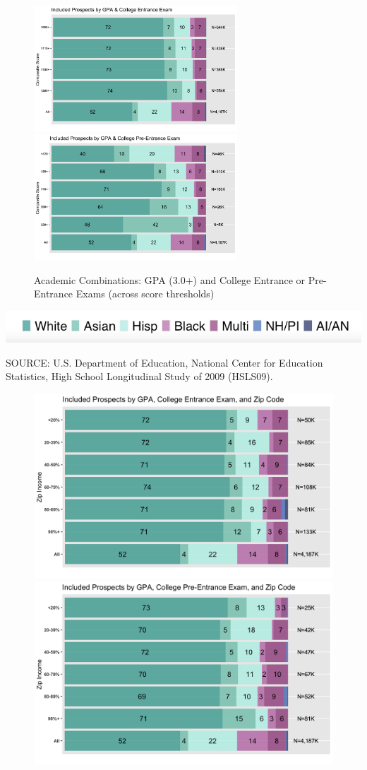 \documentclass[
  12pt,
]{article}
\begin{document}
\pagebreak

\begin{landscape}



\begin{figure}

{\centering \includegraphics[width=3in]{./../../outputs/figures/combo1_inc_satv2} \includegraphics[width=3in]{./../../outputs/figures/combo1_inc_psatv2} 

}

\caption{Academic Combinations: GPA (3.0+) and College Entrance or Pre-Entrance Exams (across score thresholds)}\label{fig:gpa-sat-psat}
\end{figure}


\begin{center}\includegraphics[width=0.32\linewidth]{./../../outputs/figures/legend_horizontal} \end{center}

\begingroup
\fontsize{8}{8}\selectfont
SOURCE: U.S. Department of Education, National Center for Education Statistics, High School Longitudinal Study of 2009 (HSLS09).
\endgroup

\pagebreak


\begin{figure}

{\centering \includegraphics[width=0.35\linewidth]{./../../outputs/figures/combo2_inc_satV2} \includegraphics[width=0.35\linewidth]{./../../outputs/figures/combo2_inc_psatV2} 

}
\end{figure}
\end{landscape}
\end{document}
